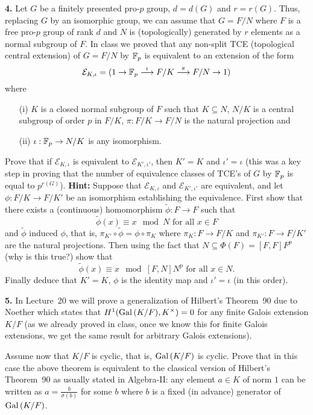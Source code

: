 \documentclass[12pt]{amsart}
\begin{document}
{\bf 4.} Let $G$ be a finitely presented pro-$p$ group, $d=d(G)$ and $r=r(G)$. Thus, replacing $G$
by an isomorphic group, we can assume that $G=F/N$ where $F$ is a free pro-$p$ group of rank $d$
and $N$ is (topologically) generated by $r$ elements as a normal subgroup of $F$. 
In class we proved that any non-split TCE (topological central extension) of $G=F/N$ by ${\mathbb F}_p$ is
equivalent to an extension of the form 
$$\mathcal E_{K,\iota}=(1\to {\mathbb F}_p\stackrel{\iota}{\longrightarrow} F/K\stackrel{\pi}{\longrightarrow}F/N\to 1)$$
where 
\begin{itemize}
\item[(i)] $K$ is a closed normal subgroup of $F$ such that $K\subseteq N$, $N/K$ is a central
subgroup of order $p$ in $F/K$,  $\pi:F/K\to F/N$ is the natural projection and 
\item[(ii)] $\iota:{\mathbb F}_p\to N/K$ is any isomorphism. 
\end{itemize}
Prove that if $\mathcal E_{K,\iota}$ is equivalent to $\mathcal E_{K',\iota'}$, then $K'=K$ and $\iota'=\iota$
(this was a key step in proving that the number of equivalence classes of TCE's of $G$ by ${\mathbb F}_p$
is equal to $p^{r(G)}$). 
\skv
{\bf Hint:} Suppose that $\mathcal E_{K,\iota}$ and $\mathcal E_{K',\iota'}$ are equivalent, and let
$\phi:F/K\to F/K'$ be an isomorphism establishing the equivalence. First show that
there exists a (continuous) homomorphism $\widetilde \phi: F\to F$ such that  
$$\widetilde \phi(x)\equiv x\mod N\mbox{ for all }x\in F$$ and $\widetilde \phi$ induced $\phi$, that
is, $\pi_{K'}\circ\widetilde \phi=\phi\circ \pi_K$ where $\pi_K:F\to F/K$ and $\pi_{K'}:F\to F/K'$
are the natural projections. Then using the fact that $N\subseteq \Phi(F)=[F,F]F^p$ (why is this true?)
show that $$\widetilde \phi(x)\equiv x\mod [F,N]N^p \mbox{ for all }x\in N.$$ Finally deduce that
$K'=K$, $\phi$ is the identity map and $\iota'=\iota$ (in this order).
\skv
 

{\bf 5.} In Lecture~20 we will prove a generalization of Hilbert's Theorem~90 due to Noether which states
that $H^1({\rm Gal\,}(K/F),K^{\times})=0$ for any finite Galois extension $K/F$ (as we already proved in class,
once we know this for finite Galois extensions, we get the same result for arbitrary Galois extensions).

Assume now that $K/F$ is cyclic, that is, ${\rm Gal\,}(K/F)$ is cyclic. Prove that in this case
the above theorem is equivalent to the classical version of Hilbert's Theorem~90 as usually stated in Algebra-II:
any element $a\in K$ of norm $1$ can be written as $a=\frac{b}{\sigma(b)}$ for some $b$ where
$b$ is a fixed (in advance) generator of ${\rm Gal\,}(K/F)$. 
\end{document}
